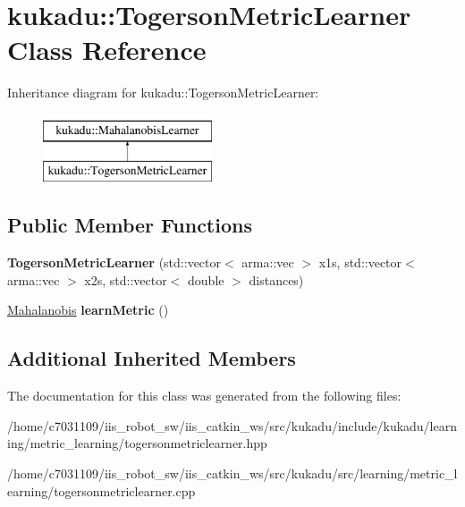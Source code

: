 \hypertarget{classkukadu_1_1TogersonMetricLearner}{\section{kukadu\-:\-:Togerson\-Metric\-Learner Class Reference}
\label{classkukadu_1_1TogersonMetricLearner}
}
Inheritance diagram for kukadu\-:\-:Togerson\-Metric\-Learner\-:\begin{figure}[H]
\begin{center}
\leavevmode
\includegraphics[height=2.000000cm]{classkukadu_1_1TogersonMetricLearner}
\end{center}
\end{figure}
\subsection*{Public Member Functions}
\begin{DoxyCompactItemize}
\item 
\hypertarget{classkukadu_1_1TogersonMetricLearner_acb7df611f6bfd82cdbe6f681af67bd9f}{{\bfseries Togerson\-Metric\-Learner} (std\-::vector$<$ arma\-::vec $>$ x1s, std\-::vector$<$ arma\-::vec $>$ x2s, std\-::vector$<$ double $>$ distances)}\label{classkukadu_1_1TogersonMetricLearner_acb7df611f6bfd82cdbe6f681af67bd9f}

\item 
\hypertarget{classkukadu_1_1TogersonMetricLearner_a09e573f9cab3c7cb9d0164dd5568875b}{\hyperlink{classkukadu_1_1Mahalanobis}{Mahalanobis} {\bfseries learn\-Metric} ()}\label{classkukadu_1_1TogersonMetricLearner_a09e573f9cab3c7cb9d0164dd5568875b}

\end{DoxyCompactItemize}
\subsection*{Additional Inherited Members}


The documentation for this class was generated from the following files\-:\begin{DoxyCompactItemize}
\item 
/home/c7031109/iis\-\_\-robot\-\_\-sw/iis\-\_\-catkin\-\_\-ws/src/kukadu/include/kukadu/learning/metric\-\_\-learning/togersonmetriclearner.\-hpp\item 
/home/c7031109/iis\-\_\-robot\-\_\-sw/iis\-\_\-catkin\-\_\-ws/src/kukadu/src/learning/metric\-\_\-learning/togersonmetriclearner.\-cpp\end{DoxyCompactItemize}
